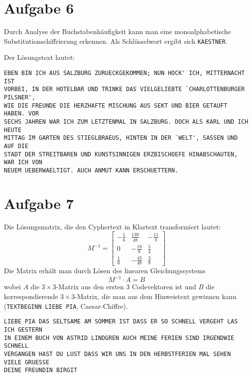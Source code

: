 \section*{Aufgabe 6}
Durch Analyse der Buchstabenhäufigkeit kann man eine monoalphabetische
Substitutionschiffrierung erkennen. Als Schlüsselwort ergibt sich
\verb/KAESTNER/.

Der Lösungstext lautet:
\begin{verbatim}
EBEN BIN ICH AUS SALZBURG ZURUECKGEKOMMEN; NUN HOCK' ICH, MITTERNACHT IST
VORBEI, IN DER HOTELBAR UND TRINKE DAS VIELGELIEBTE `CHARLOTTENBURGER PILSNER',
WIE DIE FREUNDE DIE HERZHAFTE MISCHUNG AUS SEKT UND BIER GETAUFT HABEN. VOR
SECHS JAHREN WAR ICH ZUM LETZTENMAL IN SALZBURG. DOCH ALS KARL UND ICH HEUTE
MITTAG IM GARTEN DES STIEGLBRAEUS, HINTEN IN DER `WELT', SASSEN UND AUF DIE
STADT DER STREITBAREN UND KUNSTSINNIGEN ERZBISCHOEFE HINABSCHAUTEN, WAR ICH VON
NEUEM UEBERWAELTIGT. AUCH ANMUT KANN ERSCHUETTERN.
\end{verbatim}

\section*{Aufgabe 7}
Die Lösungsmatrix, die den Cyphertext in Klartext transformiert lautet:
\[ \renewcommand{\arraystretch}{1.4}
M^{-1} = 
\begin{bmatrix}
		-\frac{1}{6}& \frac{139}{48}& -\frac{11}{8}\\
		0& -\frac{19}{8}& \frac{5}{4}\\
		\frac{1}{6}& -\frac{43}{48}& \frac{3}{8}
\end{bmatrix} \]
Die Matrix erhält man durch Lösen des linearen Gleichungssystems
\[ M^{-1} \cdot A = B \]
wobei $A$ die $3\times 3$-Matrix aus den ersten $3$ Codevektoren ist und $B$
die korrespondierende $3\times 3$-Matrix, die man aus dem Hinweistext gewinnen
kann (\verb/TEXTBEGINN LIEBE PIA/, Caesar-Chiffre).
\begin{verbatim}
LIEBE PIA DAS SELTSAME AM SOMMER IST DASS ER SO SCHNELL VERGEHT LAS ICH GESTERN
IN EINEM BUCH VON ASTRID LINDGREN AUCH MEINE FERIEN SIND IRGENDWIE SCHNELL
VERGANGEN HAST DU LUST DASS WIR UNS IN DEN HERBSTFERIEN MAL SEHEN VIELE GRUESSE
DEINE FREUNDIN BIRGIT
\end{verbatim}

